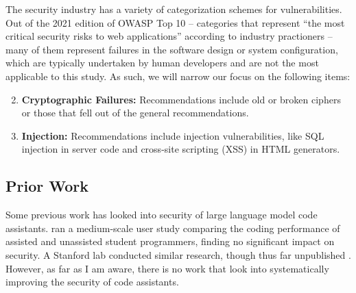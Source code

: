 \documentclass[10pt,sigplan,screen,nonacm]{acmart}
\begin{document}
The security industry has a variety of categorization schemes for vulnerabilities. Out of the 2021 edition of OWASP Top 10 \cite{owasp-top10} -- categories that represent ``the most critical security risks to web applications'' according to industry practioners --
many of them represent failures in the software design or system configuration, which are typically undertaken by human developers and are not the most applicable to this study. As such, we will narrow our focus on the following items:
\begin{enumerate}
    \setcounter{enumi}{1}
    \item \textbf{Cryptographic Failures:} Recommendations include old or broken ciphers or those that fell out of the general recommendations.
    
    \item \textbf{Injection:} Recommendations include injection vulnerabilities, like SQL injection in server code and cross-site scripting (XSS) in HTML generators.
\end{enumerate}

\subsection{Prior Work}
Some previous work has looked into security of large language model code assistants.  \cite{nyuuserstudy} ran a medium-scale user study comparing the coding performance of assisted and unassisted student programmers, finding no significant impact on security. A Stanford lab conducted similar research, though thus far unpublished \cite{labstudy}. However, as far as I am aware, there is no work that look into systematically improving the security of code assistants.
\end{document}
